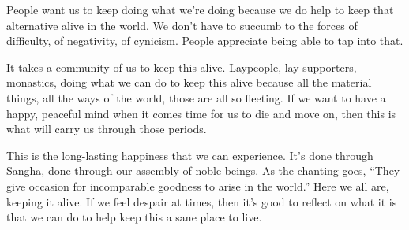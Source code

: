 People want us to keep doing what we're doing because we do help to keep that alternative alive in the world. We don't have to succumb to the forces of difficulty, of negativity, of cynicism. People appreciate being able to tap into that.

It takes a community of us to keep this alive. Laypeople, lay supporters, monastics, doing what we can do to keep this alive because all the material things, all the ways of the world, those are all so fleeting. If we want to have a happy, peaceful mind when it comes time for us to die and move on, then this is what will carry us through those periods.

\enlargethispage{1\baselineskip}
This is the long-lasting happiness that we can experience. It's done through Sangha, done through our assembly of noble beings. As the chanting goes, ``They give occasion for incomparable goodness to arise in the world.'' Here we all are, keeping it alive. If we feel despair at times, then it's good to reflect on what it is that we can do to help keep this a sane place to live.
